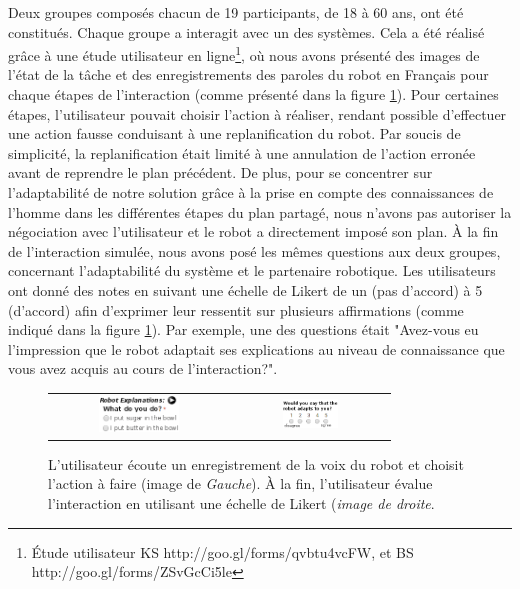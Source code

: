 \documentclass[a4paper,11pt,twoside]{StyleThese}
\begin{document}
Deux groupes composés chacun de 19 participants, de 18 à 60 ans, ont été constitués. Chaque groupe a interagit avec un des systèmes. Cela a été réalisé grâce à une étude utilisateur en ligne\footnote{Étude utilisateur KS http://goo.gl/forms/qvbtu4vcFW, et BS http://goo.gl/forms/ZSvGcCi5le}, où nous avons présenté des images de l'état de la tâche et des enregistrements des paroles du robot en Français pour chaque étapes de l'interaction (comme présenté dans la figure \ref{fig:user_study}).
Pour certaines étapes, l'utilisateur pouvait choisir l'action à réaliser, rendant possible d'effectuer une action fausse conduisant à une replanification du robot. Par soucis de simplicité, la replanification était limité à une annulation de l'action erronée avant de reprendre le plan précédent. De plus, pour se concentrer sur l'adaptabilité de notre solution grâce à la prise en compte des connaissances de l'homme dans les différentes étapes du plan partagé, nous n'avons pas autoriser la négociation avec l'utilisateur et le robot a directement imposé son plan.
À la fin de l'interaction simulée, nous avons posé les mêmes questions aux deux groupes, concernant l'adaptabilité du système et le partenaire robotique.
Les utilisateurs ont donné des notes en suivant une échelle de Likert de un (pas d'accord) à 5 (d'accord) afin d'exprimer leur ressentit sur plusieurs affirmations (comme indiqué dans la figure \ref{fig:user_study}).
Par exemple, une des questions était "Avez-vous eu l'impression que le robot adaptait ses explications au niveau de connaissance que vous avez acquis au cours de l'interaction?".

\begin{figure}[ht!]
 \centering
 \begin{tabular}{cc}
  \includegraphics[width=0.48\textwidth]{img/ustudy9.png} &
  \includegraphics[width=0.38\textwidth]{img/ustudy11.png}
 \end{tabular}
 \caption{L'utilisateur écoute un enregistrement de la voix du robot et choisit l'action à faire (image de \textit{Gauche}). À la fin, l'utilisateur évalue l'interaction en utilisant une échelle de Likert (\textit{image de droite}.}
 \label{fig:user_study}
 \end{figure}
\end{document}
